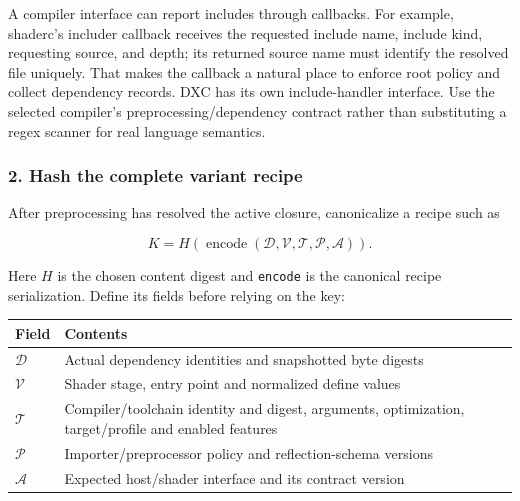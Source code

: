 A compiler interface can report includes through callbacks. For example, shaderc's includer callback receives the requested include name, include kind, requesting source, and depth; its returned source name must identify the resolved file uniquely. That makes the callback a natural place to enforce root policy and collect dependency records. DXC has its own include-handler interface. Use the selected compiler's preprocessing/dependency contract rather than substituting a regex scanner for real language semantics.

\subsubsection{2. Hash the complete variant recipe}\label{05-engine-i-ch010-hash-the-complete-variant-recipe}

After preprocessing has resolved the active closure, canonicalize a recipe such as

\[
K=H(\operatorname{encode}(\mathcal D,\mathcal V,\mathcal T,\mathcal P,\mathcal A)).
\]

Here \(H\) is the chosen content digest and \texttt{encode} is the canonical recipe serialization. Define its fields before relying on the key:

{\def\LTcaptype{none} %
\begin{longtable}[]{@{}
  >{\raggedright\arraybackslash}p{}
  >{\raggedright\arraybackslash}p{}@{}}
\toprule\noalign{}
\begin{minipage}[b]{\linewidth}\raggedright
Field
\end{minipage} & \begin{minipage}[b]{\linewidth}\raggedright
Contents
\end{minipage} \\
\midrule\noalign{}
\endhead
\bottomrule\noalign{}
\endlastfoot
\(\mathcal D\) & Actual dependency identities and snapshotted byte digests \\
\(\mathcal V\) & Shader stage, entry point and normalized define values \\
\(\mathcal T\) & Compiler/toolchain identity and digest, arguments, optimization, target/profile and enabled features \\
\(\mathcal P\) & Importer/preprocessor policy and reflection-schema versions \\
\(\mathcal A\) & Expected host/shader interface and its contract version \\
\end{longtable}
}

